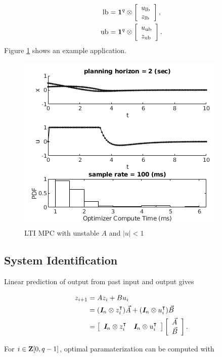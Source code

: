 \documentclass{article}
\begin{document}
    \begin{align*}
        \text{lb}&=
        \textbf{1}^q\otimes \left[\begin{array}{lllllllllllllllllll}u_{\text{lb}} \\ z_{\text{lb}}\end{array}\right],
        \\
        \text{ub}&=
        \textbf{1}^q\otimes \left[\begin{array}{lllllllllllllllllll}u_{\text{ub}} \\ z_{\text{ub}}\end{array}\right].   
    \end{align*}
    Figure \ref{fig:mpc_lti} shows an example application.
    \begin{figure}[h!]
        \centering
        \includegraphics[width=.6\textwidth]{./figs/mpc/mpc_lti.png}
        \caption{LTI MPC with unstable $A$ and $|u|<1$}
        \label{fig:mpc_lti}
    \end{figure}

    \clearpage
\subsection{System Identification}

    Linear prediction of output from past input and output gives

    \begin{align*}
        z_{i+1} &=  Az_i+Bu_i\\
        &=(\emph{\textbf{I}}_n\otimes z_i^\intercal)\vec{A}+(\emph{\textbf{I}}_n\otimes u_i^\intercal)\vec{B}\\
        &= \left[\begin{array}{ll}
            \emph{\textbf{I}}_n\otimes z_i^\intercal & \emph{\textbf{I}}_n\otimes u_i^\intercal
        \end{array}\right]\left[\begin{array}{l}
            \vec{A}
            \\
            \vec{B}
        \end{array}\right].
    \end{align*}

    For $i\in\textbf{Z}[0,q-1]$, 
    optimal paramaterization can be computed with
\end{document}
